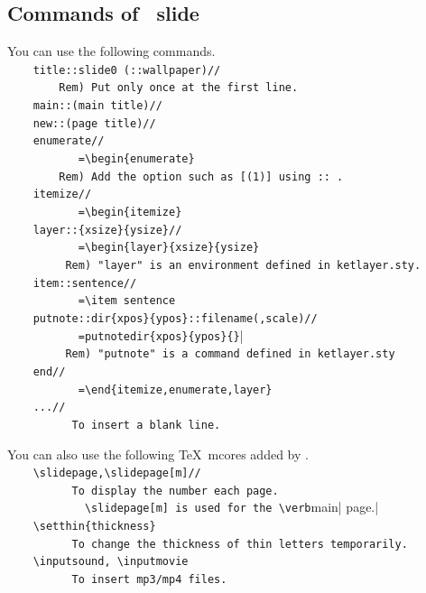 \documentclass[papersize,a4paper,12pt]{article}
\begin{document}
\subsection{Commands of \ketcindy\ slide}

You can use the following commands.\\
\verb|    title::slide0 (::wallpaper)//|\\
\verb|        Rem) Put only once at the first line.|\\
\verb|    main::(main title)//|\\
\verb|    new::(page title)//|\\
\verb|    enumerate//|\\
\verb|           =\begin{enumerate}|\\
\verb|        Rem) Add the option such as [(1)] using :: .|\\
\verb|    itemize//|\\
\verb|           =\begin{itemize}|\\
\verb|    layer::{xsize}{ysize}//|\\
\verb|           =\begin{layer}{xsize}{ysize}|\\
\verb|         Rem) "layer" is an environment defined in ketlayer.sty.|\\
\verb|    item::sentence//|\\
\verb|           =\item sentence|\\
\verb|    putnote::dir{xpos}{ypos}::filename(,scale)//|\\
\verb|           =putnotedir{xpos}{ypos}{}||\\
\verb|         Rem) "putnote" is a command defined in ketlayer.sty|\\
\verb|    end//|\\
\verb|           =\end{itemize,enumerate,layer}|\\
\verb|    ...//|\\
\verb|          To insert a blank line.|

\noindent
You can also use the following \TeX\ mcores added by \ketcindy.\\
\verb|    \slidepage,\slidepage[m]//|\\
\verb|          To display the number each page.|\\
\verb|            \slidepage[m] is used for the \verb|main| page.|\\
\verb|    \setthin{thickness}|\\
\verb|          To change the thickness of thin letters temporarily.|\\
\verb|    \inputsound, \inputmovie|\\
\verb|          To insert mp3/mp4 files.|
\end{document}
